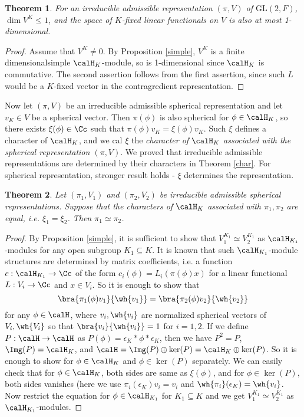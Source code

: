 \documentclass{article}
\newtheorem{theorem}{Theorem}[section]
\newcommand{\GL}{\mathrm{GL}}
\begin{document}
\begin{theorem}
For an irreducible admissible representation $(\pi, V)$ of $\GL(2, F)$,  $\dim V^{K} \leq 1$, and the space of $K$-fixed linear functionals on $V$ is also at most 1-dimensional. 
\end{theorem}
\begin{proof}
Assume that $V^{K} \neq 0$. By Proposition \ref{simple}, $V^{K}$ is a finite dimensionalsimple $\calH_K$-module, so is 1-dimensional since $\calH_K$ is commutative. 
The second assertion follows from the first assertion, since such $L$ would be a $K$-fixed vector in the contragredient representation. 
\end{proof}

Now let $(\pi, V)$ be an irreducible admissible spherical representation and let $v_K\in V$ be a spherical vector. 
Then $\pi(\phi)$ is also spherical for $\phi\in \calH_K$, so there exists $\xi(\phi)\in \Cc$ such that $\pi(\phi)v_K = \xi(\phi)v_K$. 
Such $\xi$ defines a character of $\calH_{K}$, and we cal $\xi$ the \emph{character of $\calH_K$ associated with the spherical representation $(\pi, V)$}. 
We proved that irreducible admissible representations are determined by their characters in Theorem \ref{char}. 
For spherical representation, stronger result holds - $\xi$ determines the representation. 
\begin{theorem}
\label{sphchar}
Let $(\pi_1, V_1)$ and $(\pi_2, V_2)$ be irreducible admissible spherical representations. 
Suppose that the characters of $\calH_K$ associated with $\pi_1, \pi_2$ are equal, i.e. $\xi_1 = \xi_2$. Then $\pi_1\simeq \pi_2$. 
\end{theorem}
\begin{proof}
By Proposition \ref{simple}, it is sufficient to show that $V_{1}^{K_1}\simeq V_{2}^{K_1}$ as $\calH_{K_{1}}$-modules for any open subgroup $K_1\subseteq K$. 
It is known that such $\calH_{K_{1}}$-module structures are determined by matrix coefficients, i.e. a function $c:\calH_{K_1} \to \Cc$ of the form $c_i(\phi) = L_i(\pi(\phi)x)$ for a linear functional $L:V_i\to \Cc$ and $x\in V_i$. 
So it is enough to show that 
$$
\bra{\pi_1(\phi)v_1}{\wh{v_1}} = \bra{\pi_2(\phi)v_2}{\wh{v_2}}
$$
for any $\phi\in \calH$, where $v_i, \wh{v_i}$ are normalized spherical vectors of $V_i, \wh{V_i}$ so that $\bra{v_i}{\wh{v_i}} = 1$ for $i= 1,2$.
 If we define $P: \calH\to \calH$ as $P(\phi) = \epsilon_K * \phi * \epsilon_K$, then we have $P^{2} = P$, $\Img(P) = \calH_K$, and $\calH = \Img(P) \oplus \ker(P) = \calH_K \oplus \ker(P)$. 
So it is enough to show for $\phi\in \calH_K$ and $\phi\in \ker(P)$ separately. 
We can easily check that for $\phi \in \calH_K$, both sides are same as $\xi(\phi)$, and for $\phi\in \ker(P)$, both sides vanishes (here we use $\pi_i(\epsilon_K) v_i = v_i$ and $\wh{\pi_i}(\epsilon_K) = \wh{v_i}$. 
Now restrict the equation for $\phi\in \calH_{K_1}$ for $K_1\subseteq K$ and we get $V_1^{K_1}\simeq V_2^{K_1}$ as $\calH_{K_1}$-modules. 
\end{proof}
\end{document}
